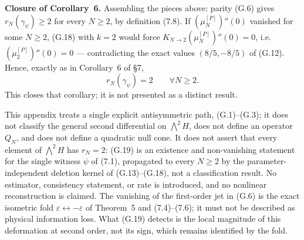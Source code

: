 \documentclass[11pt]{article}
\begin{document}
\textbf{Closure of Corollary~6.} Assembling the pieces above: parity (G.6) gives \(r_N(\gamma_\psi)\ge2\) for every \(N\ge2\), by definition (7.8). If \((\mu_N^{[P]})''(0)\) vanished for some \(N\ge2\), (G.18) with \(k=2\) would force \(K_{N\to2}(\mu_N^{[P]})''(0)=0\), i.e. \((\mu_2^{[P]})''(0)=0\) --- contradicting the exact values \((8/5,-8/5)\) of (G.12). Hence, exactly as in Corollary~6 of \S7, \[ \boxed{ r_N(\gamma_\psi)=2\qquad\forall N\ge2. } \tag{G.19} \] This closes that corollary; it is not presented as a distinct result.

This appendix treats a single explicit antisymmetric path, (G.1)--(G.3); it does not classify the general second differential on \(\bigwedge^2H\), does not define an operator \(Q_N\), and does not define a quadratic null cone. It does not assert that every element of \(\bigwedge^2H\) has \(r_N=2\): (G.19) is an existence and non-vanishing statement for the single witness \(\psi\) of (7.1), propagated to every \(N\ge2\) by the parameter-independent deletion kernel of (G.13)--(G.18), not a classification result. No estimator, consistency statement, or rate is introduced, and no nonlinear reconstruction is claimed. The vanishing of the first-order jet in (G.6) is the exact isometric fold \(\varepsilon\leftrightarrow-\varepsilon\) of Theorem~5 and (7.4)--(7.6); it must not be described as physical information loss. What (G.19) detects is the local magnitude of this deformation at second order, not its sign, which remains identified by the fold.




\end{document}
